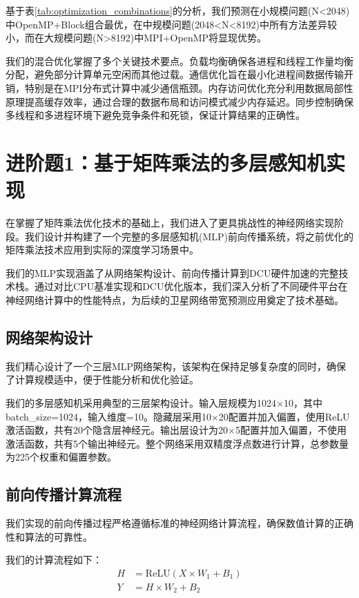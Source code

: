 \documentclass[12pt,a4paper]{article}
\begin{document}
基于表\ref{tab:optimization_combinations}的分析，我们预测在小规模问题(N<2048)中OpenMP+Block组合最优，在中规模问题(2048<N<8192)中所有方法差异较小，而在大规模问题(N>8192)中MPI+OpenMP将显现优势。

我们的混合优化掌握了多个关键技术要点。负载均衡确保各进程和线程工作量均衡分配，避免部分计算单元空闲而其他过载。通信优化旨在最小化进程间数据传输开销，特别是在MPI分布式计算中减少通信瓶颈。内存访问优化充分利用数据局部性原理提高缓存效率，通过合理的数据布局和访问模式减少内存延迟。同步控制确保多线程和多进程环境下避免竞争条件和死锁，保证计算结果的正确性。

\section{进阶题1：基于矩阵乘法的多层感知机实现}

在掌握了矩阵乘法优化技术的基础上，我们进入了更具挑战性的神经网络实现阶段。我们设计并构建了一个完整的多层感知机(MLP)前向传播系统，将之前优化的矩阵乘法技术应用到实际的深度学习场景中。

我们的MLP实现涵盖了从网络架构设计、前向传播计算到DCU硬件加速的完整技术栈。通过对比CPU基准实现和DCU优化版本，我们深入分析了不同硬件平台在神经网络计算中的性能特点，为后续的卫星网络带宽预测应用奠定了技术基础。

\subsection{网络架构设计}

我们精心设计了一个三层MLP网络架构，该架构在保持足够复杂度的同时，确保了计算规模适中，便于性能分析和优化验证。

我们的多层感知机采用典型的三层架构设计。输入层规模为1024×10，其中batch\_size=1024，输入维度=10。隐藏层采用10×20配置并加入偏置，使用ReLU激活函数，共有20个隐含层神经元。输出层设计为20×5配置并加入偏置，不使用激活函数，共有5个输出神经元。整个网络采用双精度浮点数进行计算，总参数量为225个权重和偏置参数。

\subsection{前向传播计算流程}

我们实现的前向传播过程严格遵循标准的神经网络计算流程，确保数值计算的正确性和算法的可靠性。

我们的计算流程如下：
\begin{align}
H &= \text{ReLU}(X \times W_1 + B_1) \\
Y &= H \times W_2 + B_2
\end{align}
\end{document}
